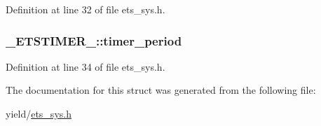 Definition at line 32 of file ets\+\_\+sys.\+h.

\subsubsection[{\texorpdfstring{timer\+\_\+period}{timer_period}}]{ \+\_\+\+E\+T\+S\+T\+I\+M\+E\+R\+\_\+\+::timer\+\_\+period}\hypertarget{struct__ETSTIMER___ad6bdd67bbd00c9d2a30052e82aac2c9a}{}\label{struct__ETSTIMER___ad6bdd67bbd00c9d2a30052e82aac2c9a}


Definition at line 34 of file ets\+\_\+sys.\+h.



The documentation for this struct was generated from the following file\+:\begin{DoxyCompactItemize}
\item 
yield/\hyperlink{ets__sys_8h}{ets\+\_\+sys.\+h}\end{DoxyCompactItemize}
